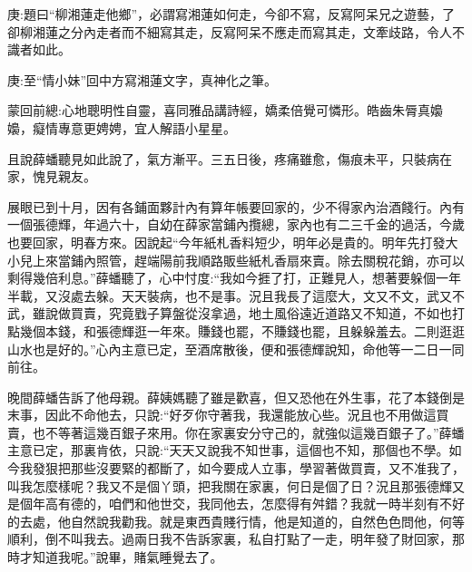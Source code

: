 
\begin{parag}
    \begin{note}庚:題曰“柳湘蓮走他鄉”，必謂寫湘蓮如何走，今卻不寫，反寫阿呆兄之遊藝，了卻柳湘蓮之分內走者而不細寫其走，反寫阿呆不應走而寫其走，文牽歧路，令人不識者如此。\end{note}
\end{parag}


\begin{parag}
    \begin{note}庚:至“情小妹”回中方寫湘蓮文字，真神化之筆。\end{note}
\end{parag}


\begin{parag}
    \begin{note}蒙回前總:心地聰明性自靈，喜同雅品講詩經，嬌柔倍覺可憐形。皓齒朱脣真嬝嬝，癡情專意更娉娉，宜人解語小星星。\end{note}
\end{parag}


\begin{parag}
    且說薛蟠聽見如此說了，氣方漸平。三五日後，疼痛雖愈，傷痕未平，只裝病在家，愧見親友。
\end{parag}


\begin{parag}
    展眼已到十月，因有各鋪面夥計內有算年帳要回家的，少不得家內治酒餞行。內有一個張德輝，年過六十，自幼在薛家當鋪內攬總，家內也有二三千金的過活，今歲也要回家，明春方來。因說起“今年紙札香料短少，明年必是貴的。明年先打發大小兒上來當鋪內照管，趕端陽前我順路販些紙札香扇來賣。除去關稅花銷，亦可以剩得幾倍利息。”薛蟠聽了，心中忖度:“我如今捱了打，正難見人，想著要躲個一年半載，又沒處去躲。天天裝病，也不是事。況且我長了這麼大，文又不文，武又不武，雖說做買賣，究竟戥子算盤從沒拿過，地土風俗遠近道路又不知道，不如也打點幾個本錢，和張德輝逛一年來。賺錢也罷，不賺錢也罷，且躲躲羞去。二則逛逛山水也是好的。”心內主意已定，至酒席散後，便和張德輝說知，命他等一二日一同前往。
\end{parag}


\begin{parag}
    晚間薛蟠告訴了他母親。薛姨媽聽了雖是歡喜，但又恐他在外生事，花了本錢倒是末事，因此不命他去，只說:“好歹你守著我，我還能放心些。況且也不用做這買賣，也不等著這幾百銀子來用。你在家裏安分守己的，就強似這幾百銀子了。”薛蟠主意已定，那裏肯依，只說:“天天又說我不知世事，這個也不知，那個也不學。如今我發狠把那些沒要緊的都斷了，如今要成人立事，學習著做買賣，又不准我了，叫我怎麼樣呢？我又不是個丫頭，把我關在家裏，何日是個了日？況且那張德輝又是個年高有德的，咱們和他世交，我同他去，怎麼得有舛錯？我就一時半刻有不好的去處，他自然說我勸我。就是東西貴賤行情，他是知道的，自然色色問他，何等順利，倒不叫我去。過兩日我不告訴家裏，私自打點了一走，明年發了財回家，那時才知道我呢。”說畢，賭氣睡覺去了。
\end{parag}


